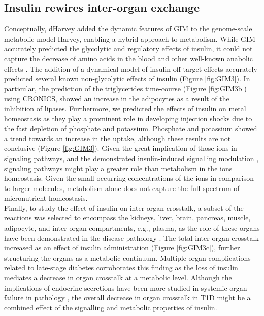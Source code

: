 \subsection{Insulin rewires inter-organ exchange}
Conceptually, dHarvey added the dynamic features of GIM to the genome-scale metabolic model Harvey, enabling a hybrid approach to metabolism. While GIM accurately predicted the glycolytic and regulatory effects of insulin, it could not capture the decrease of amino acids in the blood and other well-known anabolic effects \cite{dimitriadis2011insulin}. The addition of a dynamical model of insulin off-target effects \cite{yugi2014reconstruction} accurately predicted several known non-glycolytic effects of insulin (Figure \ref{fig:GIM3}). In  particular, the prediction of the triglycerides time-course (Figure \ref{fig:GIM3b}) using CRONICS, showed an increase in the adipocytes as a result of the inhibition of lipases. Furthermore, we predicted the effects of insulin on metal homeostasis as they play a prominent role in developing injection shocks due to the fast depletion of phosphate and potassium. Phosphate and potassium showed a trend towards an increase in the uptake, although these results are not conclusive (Figure \ref{fig:GIM3}). Given the great implication of those ions in signaling pathways, and the demonstrated insulin-induced signalling modulation \cite{yugi2014reconstruction}, signaling pathways might play a greater role than metabolism in the ions homeostasis. Given the small occurring concentrations of the ions in comparison to larger molecules, metabolism alone does not capture the full spectrum of micronutrient homeostasis.\\
Finally, to study the effect of insulin on inter-organ crosstalk, a subset of the reactions was selected to encompass the kidneys, liver, brain, pancreas, muscle, adipocyte, and inter-organ compartments, e.g., plasma, as the role of these organs have been demonstrated in the disease pathology \cite{li2009organ, romacho2014adipose}. The total inter-organ crosstalk increased as an effect of insulin administration (Figure \ref{fig:GIM3c}), further structuring the organs as a metabolic continuum. Multiple organ complications related to late-stage diabetes corroborates this finding as the loss of insulin mediates a decrease in organ crosstalk at a metabolic level. 
Although the implications of endocrine secretions have been more studied in systemic organ failure in pathology \cite{li2009organ}, the overall decrease in organ crosstalk in T1D might be a combined effect of the signalling and metabolic properties of insulin. 

